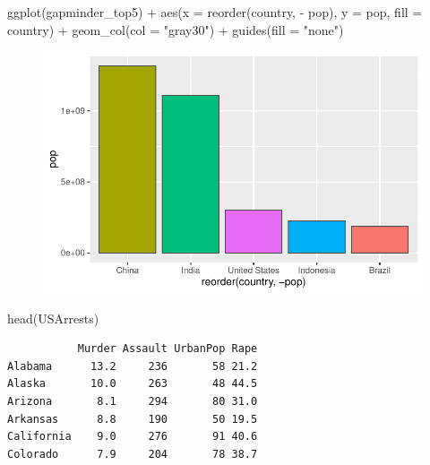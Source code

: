 \documentclass[
  letterpaper,
  DIV=11,
  numbers=noendperiod]{scrartcl}
\newenvironment{Shaded}{\begin{snugshade}}{\end{snugshade}}
\newcommand{\AttributeTok}[1]{\textcolor[rgb]{0.40,0.45,0.13}{#1}}
\newcommand{\FunctionTok}[1]{\textcolor[rgb]{0.28,0.35,0.67}{#1}}
\newcommand{\NormalTok}[1]{\textcolor[rgb]{0.00,0.23,0.31}{#1}}
\newcommand{\SpecialCharTok}[1]{\textcolor[rgb]{0.37,0.37,0.37}{#1}}
\newcommand{\StringTok}[1]{\textcolor[rgb]{0.13,0.47,0.30}{#1}}
\begin{document}
\begin{Shaded}
\begin{Highlighting}[]
\FunctionTok{ggplot}\NormalTok{(gapminder\_top5) }\SpecialCharTok{+}
  \FunctionTok{aes}\NormalTok{(}\AttributeTok{x =} \FunctionTok{reorder}\NormalTok{(country, }\SpecialCharTok{{-}}\NormalTok{ pop), }\AttributeTok{y =}\NormalTok{ pop, }\AttributeTok{fill =}\NormalTok{ country) }\SpecialCharTok{+}
  \FunctionTok{geom\_col}\NormalTok{(}\AttributeTok{col =} \StringTok{"gray30"}\NormalTok{) }\SpecialCharTok{+}
  \FunctionTok{guides}\NormalTok{(}\AttributeTok{fill =} \StringTok{"none"}\NormalTok{)}
\end{Highlighting}
\end{Shaded}

\begin{figure}[H]

{\centering \includegraphics{class05_files/figure-pdf/unnamed-chunk-5-6.pdf}

}

\end{figure}

\begin{Shaded}
\begin{Highlighting}[]
\FunctionTok{head}\NormalTok{(USArrests)}
\end{Highlighting}
\end{Shaded}

\begin{verbatim}
           Murder Assault UrbanPop Rape
Alabama      13.2     236       58 21.2
Alaska       10.0     263       48 44.5
Arizona       8.1     294       80 31.0
Arkansas      8.8     190       50 19.5
California    9.0     276       91 40.6
Colorado      7.9     204       78 38.7
\end{verbatim}
\end{document}
